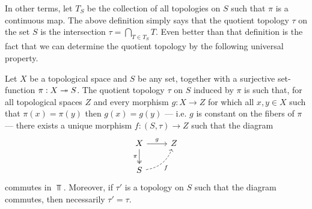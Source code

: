 In other terms, let \(T_S\) be the collection of all topologies on \(S\) such
that \(\pi\) is a continuous map. The above definition simply says that the
quotient topology \(\tau\) on the set \(S\) is the intersection
\(\tau = \bigcap_{T \in T_S}T\). Even better than that definition is the
fact that we can determine the quotient topology by the following universal
property.

\begin{theorem}
\label{thm:universal-property-quotient-topology}
Let \(X\) be a topological space and \(S\) be any set, together with a
surjective set-function \(\pi: X \twoheadrightarrow S\). The quotient topology \(\tau\)
on \(S\) induced by \(\pi\) is such that, for all topological spaces \(Z\) and
every morphism \(g: X \to Z\) for which all \(x, y \in X\) such that
\(\pi(x) = \pi(y)\) then \(g(x) = g(y)\) --- i.e. \(g\) is constant on the
fibers of \(\pi\) --- there exists a unique morphism
\(f: (S, \tau) \to Z\) such that the diagram
\[
  \begin{tikzcd}
    X \ar[r, "g"] \ar[d, two heads, swap, "\pi"] &Z\\
    S \ar[ur, swap, bend right, dashed, "f"]
  \end{tikzcd}
\]
commutes in \(\Top\). Moreover, if \(\tau'\) is a topology on \(S\) such
that the diagram commutes, then necessarily \(\tau' = \tau\).
\end{theorem}

